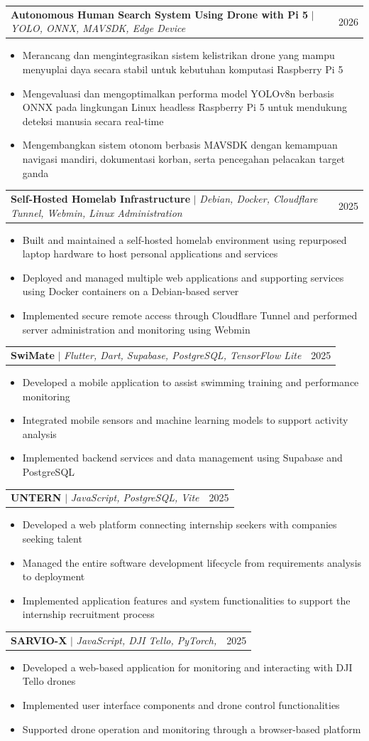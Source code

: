 \documentclass[letterpaper,11pt]{article}
\makeatletter
\newcommand{\resumeItem}[1]{
	\item\small{
		{#1 \vspace{-2pt}}
	}
}
\newcommand{\resumeProjectHeading}[2]{
	\item
	\begin{tabular*}{0.97\textwidth}{l@{\extracolsep{\fill}}r}
		\small#1 & #2 \\
	\end{tabular*}\vspace{-7pt}
}
\newcommand{\resumeItemListStart}{\begin{itemize}}
\newcommand{\resumeItemListEnd}{\end{itemize}\vspace{-5pt}}
\makeatother
\begin{document}
	\resumeProjectHeading
	{\textbf{Autonomous Human Search System Using Drone with Pi 5} $|$ \emph{YOLO, ONNX, MAVSDK, Edge Device}}{2026}
	\resumeItemListStart
	\resumeItem{Merancang dan mengintegrasikan sistem kelistrikan drone yang mampu menyuplai daya secara stabil untuk kebutuhan komputasi Raspberry Pi 5}
	\resumeItem{Mengevaluasi dan mengoptimalkan performa model YOLOv8n berbasis ONNX pada lingkungan Linux headless Raspberry Pi 5 untuk mendukung deteksi manusia secara real-time}
	\resumeItem{Mengembangkan sistem otonom berbasis MAVSDK dengan kemampuan navigasi mandiri, dokumentasi korban, serta pencegahan pelacakan target ganda}
	\resumeItemListEnd

	\resumeProjectHeading
	{\textbf{Self-Hosted Homelab Infrastructure} $|$ \emph{Debian, Docker, Cloudflare Tunnel, Webmin, Linux Administration}}{2025}
	\resumeItemListStart
	\resumeItem{Built and maintained a self-hosted homelab environment using repurposed laptop hardware to host personal applications and services}
	\resumeItem{Deployed and managed multiple web applications and supporting services using Docker containers on a Debian-based server}
	\resumeItem{Implemented secure remote access through Cloudflare Tunnel and performed server administration and monitoring using Webmin}
	\resumeItemListEnd
	
	\resumeProjectHeading
	{\textbf{SwiMate} $|$ \emph{Flutter, Dart, Supabase, PostgreSQL, TensorFlow Lite}}{2025}
	\resumeItemListStart
	\resumeItem{Developed a mobile application to assist swimming training and performance monitoring}
	\resumeItem{Integrated mobile sensors and machine learning models to support activity analysis}
	\resumeItem{Implemented backend services and data management using Supabase and PostgreSQL}
	\resumeItemListEnd
	
	\resumeProjectHeading
	{\textbf{UNTERN} $|$ \emph{JavaScript, PostgreSQL, Vite}}{2025}
	\resumeItemListStart
	\resumeItem{Developed a web platform connecting internship seekers with companies seeking talent}
	\resumeItem{Managed the entire software development lifecycle from requirements analysis to deployment}
	\resumeItem{Implemented application features and system functionalities to support the internship recruitment process}
	\resumeItemListEnd
	
	\resumeProjectHeading
	{\textbf{SARVIO-X} $|$ \emph{JavaScript, DJI Tello, PyTorch, }}{2025}
	\resumeItemListStart
	\resumeItem{Developed a web-based application for monitoring and interacting with DJI Tello drones}
	\resumeItem{Implemented user interface components and drone control functionalities}
	\resumeItem{Supported drone operation and monitoring through a browser-based platform}
	\resumeItemListEnd
	
\end{document}

